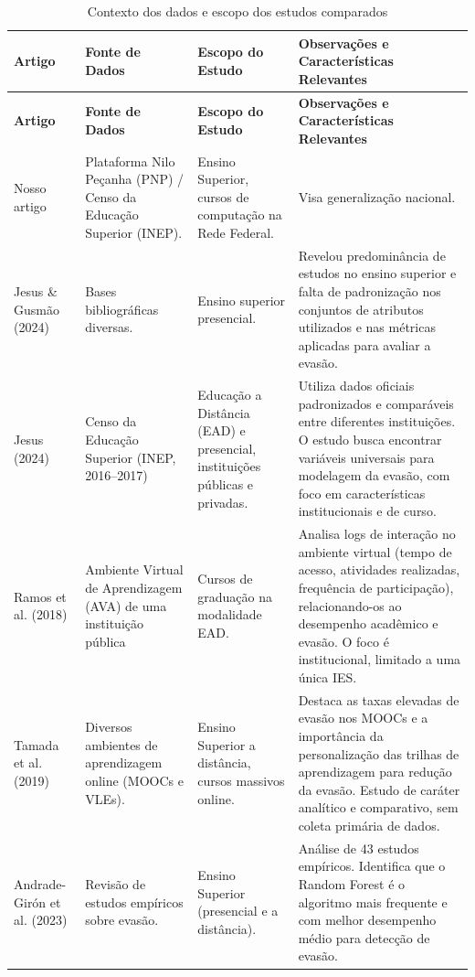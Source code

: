 \documentclass[english, spanish, brazilian]{RBIEarticle} %
\begin{document}
\begin{longtable}{|p{3cm}|p{3.5cm}|p{4.5cm}|p{5cm}|}
    \caption{Contexto dos dados e escopo dos estudos comparados}\\
    \toprule
    \textbf{Artigo} & \textbf{Fonte de Dados} & \textbf{Escopo do Estudo} & \textbf{Observações e Características Relevantes} \\
    \midrule
    \endfirsthead
    \toprule
    \textbf{Artigo} & \textbf{Fonte de Dados} & \textbf{Escopo do Estudo} & \textbf{Observações e Características Relevantes} \\
    \midrule
    \endhead
    Nosso artigo & Plataforma Nilo Peçanha (PNP) / Censo da Educação Superior (INEP). & Ensino Superior, cursos de computação na Rede Federal. & Visa generalização nacional. \\ \hline
    
    Jesus \& Gusmão (2024) & Bases bibliográficas diversas. & Ensino superior presencial. & Revelou predominância de estudos no ensino superior e falta de padronização nos conjuntos de atributos utilizados e nas métricas aplicadas para avaliar a evasão. \\ \hline
    
    Jesus (2024) & Censo da Educação Superior (INEP, 2016–2017) & Educação a Distância (EAD) e presencial, instituições públicas e privadas. & Utiliza dados oficiais padronizados e comparáveis entre diferentes instituições. O estudo busca encontrar variáveis universais para modelagem da evasão, com foco em características institucionais e de curso. \\ \hline
    
    Ramos et al. (2018) & Ambiente Virtual de Aprendizagem (AVA) de uma instituição pública & Cursos de graduação na modalidade EAD. & Analisa logs de interação no ambiente virtual (tempo de acesso, atividades realizadas, frequência de participação), relacionando-os ao desempenho acadêmico e evasão. O foco é institucional, limitado a uma única IES. \\ \hline
    
    Tamada et al. (2019) & Diversos ambientes de aprendizagem online (MOOCs e VLEs). & Ensino Superior a distância, cursos massivos online. & Destaca as taxas elevadas de evasão nos MOOCs e a importância da personalização das trilhas de aprendizagem para redução da evasão. Estudo de caráter analítico e comparativo, sem coleta primária de dados. \\ \hline
    
    Andrade-Girón et al. (2023) & Revisão de estudos empíricos sobre evasão. & Ensino Superior (presencial e a distância). & Análise de 43 estudos empíricos. Identifica que o Random Forest é o algoritmo mais frequente e com melhor desempenho médio para detecção de evasão. \\ \hline
    

\end{longtable}
\end{document}

